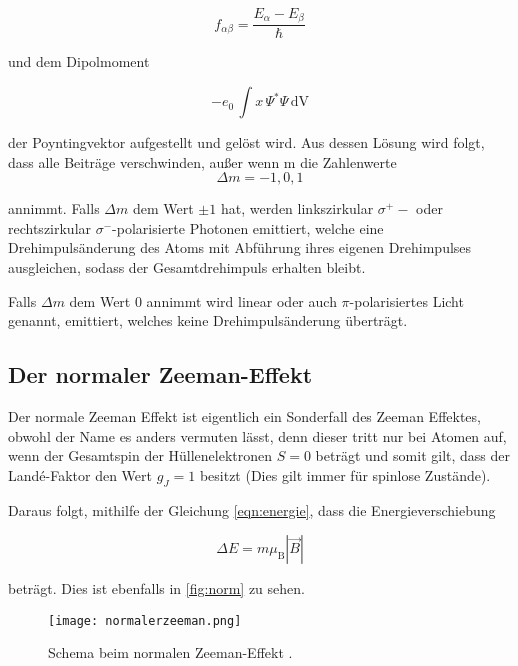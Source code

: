 \begin{equation}
    f_{\alpha\beta}= \frac{E_{\alpha} - E_{\beta}}{\hbar}
    \label{eqn:f}
  \end{equation}

\noindent
und dem Dipolmoment 

  \begin{equation}
    -e_0\, \int x \, \Psi^* \Psi \, \text{dV}
  \end{equation}

der Poyntingvektor aufgestellt und gelöst wird. Aus dessen Lösung wird folgt, dass alle Beiträge verschwinden, außer wenn m die Zahlenwerte
\begin{equation}
  \Delta m = -1,0,1
\end{equation}

\noindent
annimmt. Falls $\Delta m $ dem Wert $ \pm 1$ hat,  werden linkszirkular $\sigma^{+}-$ oder rechtszirkular $\sigma^{-}$-polarisierte
Photonen emittiert, welche eine Drehimpulsänderung des Atoms mit Abführung ihres eigenen Drehimpulses ausgleichen,
sodass der Gesamtdrehimpuls erhalten bleibt. 

\noindent
Falls $\Delta m $ dem Wert $0$ annimmt wird linear oder auch $\pi$-polarisiertes Licht genannt, emittiert,
welches keine Drehimpulsänderung überträgt.
 
\subsection{Der normaler Zeeman-Effekt}
Der normale Zeeman Effekt ist eigentlich ein Sonderfall des Zeeman Effektes, obwohl der Name es anders vermuten lässt, denn dieser tritt nur bei Atomen auf, wenn der 
Gesamtspin der Hüllenelektronen $S = 0$ beträgt und somit  gilt, dass der Landé-Faktor den Wert $g_J = 1$ besitzt (Dies gilt immer für spinlose Zustände).

\noindent
Daraus folgt, mithilfe der Gleichung \ref{eqn:energie}, dass die Energieverschiebung 

\begin{equation}
    \Delta E = m \mu_\text{B} |\vec{B}| 
\end{equation}

\noindent
beträgt. Dies ist ebenfalls in \autoref{fig:norm} zu sehen.

\vspace{-5pt}
\begin{figure}[H]
    \centering
    \texttt{[image: normalerzeeman.png]}
    \caption{Schema beim normalen Zeeman-Effekt \cite{V27}.}
    \label{fig:norm}
\end{figure}

